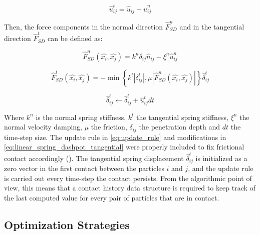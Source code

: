 \documentclass[Afour,sageh,times]{sagej}
\begin{document}
\begin{equation}
    \hat{u}_{ij}^{t} = \hat{u}_{ij} - \hat{u}_{ij}^{n}
    \label{eq:relative_contact_velocity_t}
\end{equation}

Then, the force components in the normal direction $\hat{F}_{SD}^{n}$ and in the tangential direction $\hat{F}_{SD}^{t}$ can be defined as:

\begin{equation}
    \hat{F}_{SD}^{n}(\hat{x_i}, \hat{x_j}) = k^{n}\delta_{ij}\hat{n}_{ij} - \xi^{n}\hat{u}_{ij}^{n}
    \label{eq:linear_spring_dashpot_normal}
\end{equation}

\begin{equation}
    \hat{F}_{SD}^{t}(\hat{x_i}, \hat{x_j}) = -\min \left\{ k^{t}\left| \delta^{t}_{ij} \right|,\mu\left|\hat{F}_{SD}^{n}(\hat{x_i}, \hat{x_j}) \right| \right\} \hat{\delta}^{t}_{ij}
    \label{eq:linear_spring_dashpot_tangential}
\end{equation}

\begin{equation}
    \hat{\delta}^{t}_{ij} \gets \hat{\delta}^{t}_{ij} + \hat{u}_{ij}^{t}dt
    \label{eq:update_rule}
\end{equation}

Where $k^{n}$ is the normal spring stiffness, $k^{t}$ the tangential spring stiffness, $\xi^{n}$ the normal velocity damping, $\mu$ the friction, $\delta_{ij}$ the penetration depth and $dt$ the time-step size.
The update rule in \autoref{eq:update_rule} and modifications in \autoref{eq:linear_spring_dashpot_tangential} were properly included to fix frictional contact accordingly (\cite{dem1,dem2}).
The tangential spring displacement $\hat{\delta}^{t}_{ij}$ is initialized as a zero vector in the first contact between the particles $i$ and $j$, and the update rule is carried out every time-step the contact persists.
From the algorithmic point of view, this means that a contact history data structure is required to keep track of the last computed value for every pair of particles that are in contact.

\subsection{Optimization Strategies}
\label{sec:opts}
\end{document}
